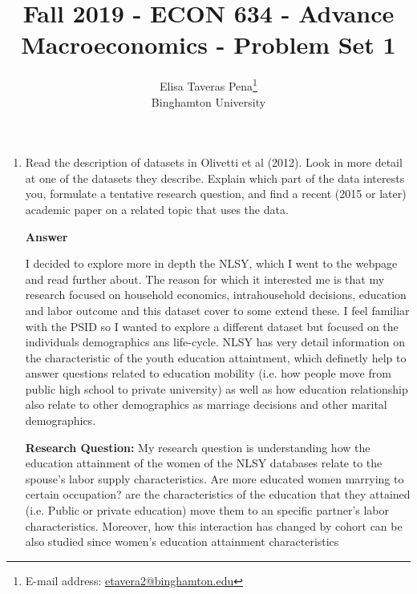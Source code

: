 \documentclass[12pt]{article}%
\begin{document}
\title{Fall 2019 - ECON 634 - Advance Macroeconomics - Problem Set 1}
\author{Elisa Taveras Pena\footnote{E-mail address: \href{mailto:etavera2@binghamton.edu}{etavera2@binghamton.edu}  }\\
Binghamton University}
\maketitle

\sloppy%

\onehalfspacing

\begin{enumerate}
	\item Read the description of datasets in Olivetti et al (2012). Look in more detail at one of the datasets they describe. Explain which part of the data interests you, formulate a tentative research question, and find a recent (2015 or later) academic paper on a related topic that uses the data.
	    	\vspace{3mm}
	
	{\bf Answer}   	
	
	\vspace{3mm}
	
	I decided to explore more in depth the NLSY, which I went to the webpage and read further about. The reason for which it interested me is that my research focused on household economics, intrahousehold decisions, education and labor outcome and this dataset cover to some extend these. I feel familiar with the PSID so I wanted to explore a different dataset but focused on the individuals demographics ans life-cycle. NLSY has very detail information on the characteristic of the youth education attaintment, which definetly help to answer questions related to education mobility (i.e. how people move from public high school to private university) as well as how education relationship also relate to other demographics as marriage decisions and other marital demographics.
	
	\textbf{Research Question:}
	My research question is understanding how the education attainment of the women of the NLSY databases relate to the spouse's labor supply characteristics. Are more educated women marrying to certain occupation? are the characteristics of the education that they attained (i.e. Public or private education) move them to an specific partner's labor characteristics. Moreover, how this interaction has changed by cohort can be also studied since women's education attainment characteristics 
	

\end{enumerate}
\end{document}
